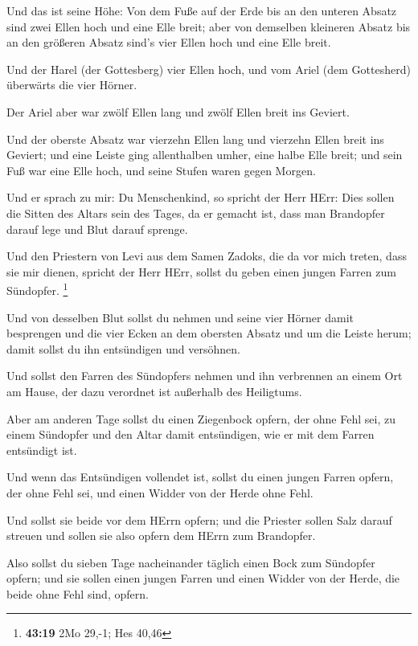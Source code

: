  Und das ist seine Höhe: Von dem Fuße auf der Erde bis an
den unteren Absatz sind zwei Ellen hoch und eine Elle breit; aber von
demselben kleineren Absatz bis an den größeren Absatz sind's vier Ellen
hoch und eine Elle breit.

 Und der Harel (der Gottesberg) vier Ellen hoch, und vom
Ariel (dem Gottesherd) überwärts die vier Hörner.

 Der Ariel aber war zwölf Ellen lang und zwölf Ellen breit
ins Geviert.

 Und der oberste Absatz war vierzehn Ellen lang und
vierzehn Ellen breit ins Geviert; und eine Leiste ging allenthalben
umher, eine halbe Elle breit; und sein Fuß war eine Elle hoch, und seine
Stufen waren gegen Morgen.

 Und er sprach zu mir: Du Menschenkind, so spricht der Herr
HErr: Dies sollen die Sitten des Altars sein des Tages, da er gemacht
ist, dass man Brandopfer darauf lege und Blut darauf sprenge.

 Und den Priestern von Levi aus dem Samen Zadoks, die da
vor mich treten, dass sie mir dienen, spricht der Herr HErr, sollst du
geben einen jungen Farren zum Sündopfer. \footnote{\textbf{43:19} 2Mo
  29,-1; Hes 40,46}

 Und von desselben Blut sollst du nehmen und seine vier
Hörner damit besprengen und die vier Ecken an dem obersten Absatz und um
die Leiste herum; damit sollst du ihn entsündigen und versöhnen.

 Und sollst den Farren des Sündopfers nehmen und ihn
verbrennen an einem Ort am Hause, der dazu verordnet ist außerhalb des
Heiligtums.

 Aber am anderen Tage sollst du einen Ziegenbock opfern,
der ohne Fehl sei, zu einem Sündopfer und den Altar damit entsündigen,
wie er mit dem Farren entsündigt ist.

 Und wenn das Entsündigen vollendet ist, sollst du einen
jungen Farren opfern, der ohne Fehl sei, und einen Widder von der Herde
ohne Fehl.

 Und sollst sie beide vor dem HErrn opfern; und die
Priester sollen Salz darauf streuen und sollen sie also opfern dem HErrn
zum Brandopfer.

 Also sollst du sieben Tage nacheinander täglich einen Bock
zum Sündopfer opfern; und sie sollen einen jungen Farren und einen
Widder von der Herde, die beide ohne Fehl sind, opfern.

